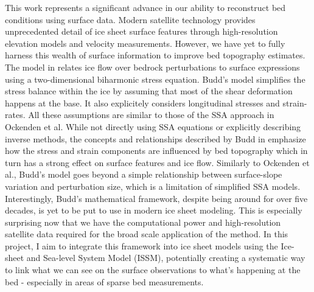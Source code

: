 This work represents a significant advance in our ability to reconstruct bed conditions using surface data. Modern satellite technology provides unprecedented detail of ice sheet surface features through high-resolution elevation models and velocity measurements. However, we have yet to fully harness this wealth of surface information to improve bed topography estimates.
The model in \cite{Budd_1970} relates ice flow over bedrock perturbations to surface expressions using a two-dimensional biharmonic stress equation. Budd's model simplifies the stress balance within the ice by assuming that most of the shear deformation happens at the base. It also explicitely considers longitudinal stresses and strain-rates. All these assumptions are similar to those of the SSA approach in Ockenden et al. While not directly using SSA equations or explicitly describing inverse methods, the concepts and relationships described by Budd in\cite{Budd_1970} emphasize how the stress and strain components are influenced by bed topography which in turn has a strong effect on surface features and ice flow. Similarly to Ockenden et al., Budd's model goes beyond a simple relationship between surface-slope variation and perturbation size, which is a limitation of simplified SSA models\cite{Budd_1970}.
Interestingly, Budd's mathematical framework, despite being around for over five decades, is yet to be put to use in modern ice sheet modeling. This is especially surprising now that we have the computational power and high-resolution satellite data  required for the broad scale application of the method. In this project, I aim to integrate this framework into ice sheet models using the Ice-sheet and Sea-level System Model (ISSM), potentially creating a systematic way to link what we can see on the surface observations to what's happening at the bed - especially in areas of sparse bed measurements.